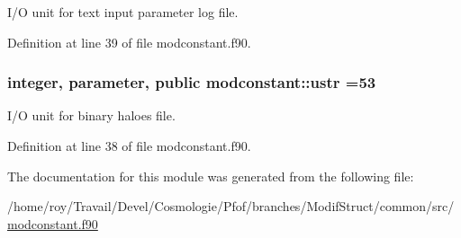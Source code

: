 I/\-O unit for text input parameter log file. 



Definition at line 39 of file modconstant.\-f90.

\hypertarget{classmodconstant_af348170b4f06a596d512347383aa406b}{
\subsubsection[{ustr}]{\setlength{\rightskip}{0pt plus 5cm}integer, parameter, public modconstant\-::ustr =53}}\label{classmodconstant_af348170b4f06a596d512347383aa406b}


I/\-O unit for binary haloes file. 



Definition at line 38 of file modconstant.\-f90.



The documentation for this module was generated from the following file\-:\begin{DoxyCompactItemize}
\item 
/home/roy/\-Travail/\-Devel/\-Cosmologie/\-Pfof/branches/\-Modif\-Struct/common/src/\hyperlink{modconstant_8f90}{modconstant.\-f90}\end{DoxyCompactItemize}
